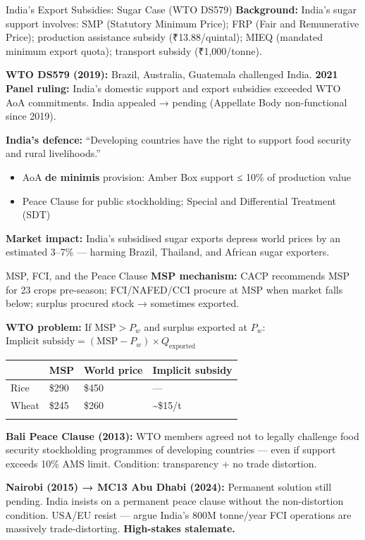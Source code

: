 \documentclass[
  ignorenonframetext,
  aspectratio=169,
]{beamer}
\makeatletter
\providecommand{\tightlist}{%
  \setlength{\itemsep}{0pt}\setlength{\parskip}{0pt}}
\let\quarto@originallabel\label
\DeclareRobustCommand*{\label}[1]{\quarto@originallabel{#1}}
\makeatother
\begin{document}
\begin{frame}{India's Export Subsidies: Sugar Case (WTO DS579)}
\label{indias-export-subsidies-sugar-case-wto-ds579}
\textbf{Background:} India's sugar support involves: SMP (Statutory
Minimum Price); FRP (Fair and Remunerative Price); production assistance
subsidy (₹13.88/quintal); MIEQ (mandated minimum export quota);
transport subsidy (₹1,000/tonne).

\textbf{WTO DS579 (2019):} Brazil, Australia, Guatemala challenged
India. \textbf{2021 Panel ruling:} India's domestic support and export
subsidies exceeded WTO AoA commitments. India appealed → pending
(Appellate Body non-functional since 2019).

\textbf{India's defence:} ``Developing countries have the right to
support food security and rural livelihoods.''

\begin{itemize}
\tightlist
\item
  AoA \textbf{de minimis} provision: Amber Box support ≤ 10\% of
  production value
\item
  Peace Clause for public stockholding; Special and Differential
  Treatment (SDT)
\end{itemize}

\textbf{Market impact:} India's subsidised sugar exports depress world
prices by an estimated 3--7\% --- harming Brazil, Thailand, and African
sugar exporters.
\end{frame}

\begin{frame}{MSP, FCI, and the Peace Clause}
\label{msp-fci-and-the-peace-clause}
\textbf{MSP mechanism:} CACP recommends MSP for 23 crops pre-season;
FCI/NAFED/CCI procure at MSP when market falls below; surplus procured
stock → sometimes exported.

\textbf{WTO problem:} If \(\text{MSP} > P_w\) and surplus exported at
\(P_w\):
\(\text{Implicit subsidy} = (\text{MSP} - P_w) \times Q_{\text{exported}}\)

\begin{longtable}[]{@{}llll@{}}
\toprule\noalign{}
& MSP & World price & Implicit subsidy \\
\midrule\noalign{}
\endhead
Rice & \$290 & \$450 & --- \\
Wheat & \$245 & \$260 & \textasciitilde\$15/t \\
\bottomrule\noalign{}
\end{longtable}

\textbf{Bali Peace Clause (2013):} WTO members agreed not to legally
challenge food security stockholding programmes of developing countries
--- even if support exceeds 10\% AMS limit. Condition: transparency + no
trade distortion.

\textbf{Nairobi (2015) → MC13 Abu Dhabi (2024):} Permanent solution
still pending. India insists on a permanent peace clause without the
non-distortion condition. USA/EU resist --- argue India's 800M
tonne/year FCI operations are massively trade-distorting.
\textbf{High-stakes stalemate.}
\end{frame}
\end{document}
